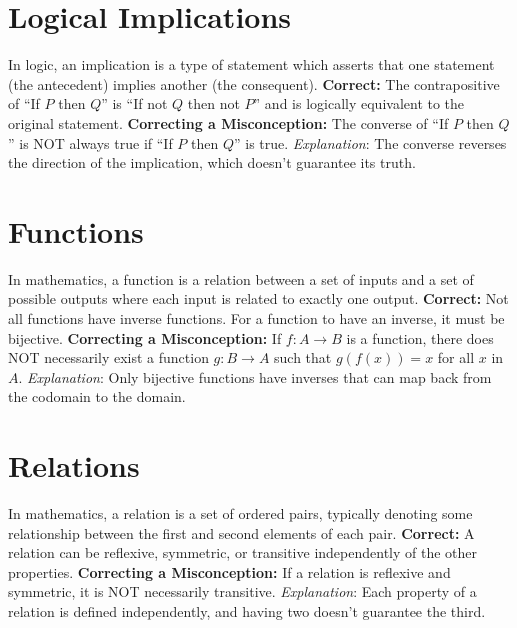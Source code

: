 \documentclass[12pt]{article}
\newenvironment{correct}{\noindent\textbf{Correct:}}{}
\newenvironment{misconception}{\noindent\textbf{Correcting a Misconception:}}{}
\newenvironment{explanation}{\noindent\textit{Explanation}:}{\vspace{1em}}
\begin{document}
\section*{Logical Implications}
In logic, an implication is a type of statement which asserts that one statement (the antecedent) implies another (the consequent).
\begin{correct} The contrapositive of ``If \(P\) then \(Q\)'' is ``If not \(Q\) then not \(P\)'' and is logically equivalent to the original statement. \end{correct}
\begin{misconception} The converse of ``If \(P\) then \(Q\)'' is NOT always true if ``If \(P\) then \(Q\)'' is true. \end{misconception}
\begin{explanation} The converse reverses the direction of the implication, which doesn't guarantee its truth. \end{explanation}

\section*{Functions}
In mathematics, a function is a relation between a set of inputs and a set of possible outputs where each input is related to exactly one output.
\begin{correct} Not all functions have inverse functions. For a function to have an inverse, it must be bijective. \end{correct}
\begin{misconception} If \(f: A \rightarrow B\) is a function, there does NOT necessarily exist a function \(g: B \rightarrow A\) such that \(g(f(x)) = x\) for all \(x\) in \(A\). \end{misconception}
\begin{explanation} Only bijective functions have inverses that can map back from the codomain to the domain. \end{explanation}

\section*{Relations}
In mathematics, a relation is a set of ordered pairs, typically denoting some relationship between the first and second elements of each pair.
\begin{correct} A relation can be reflexive, symmetric, or transitive independently of the other properties. \end{correct}
\begin{misconception} If a relation is reflexive and symmetric, it is NOT necessarily transitive. \end{misconception}
\begin{explanation} Each property of a relation is defined independently, and having two doesn't guarantee the third. \end{explanation}
\end{document}
